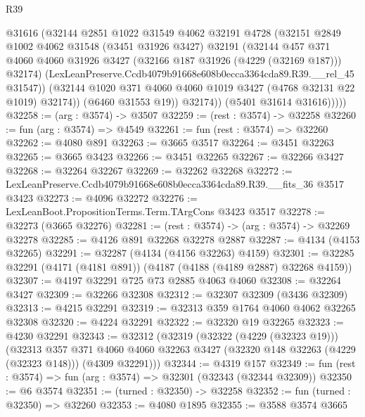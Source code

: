\begin{lexlean}{R39}
\begin{coremodule}
                  @31616
                  (@32144
                    @2851
                    @1022
                    @31549
                    @4062
                    @32191
                    @4728
                    (@32151
                      @2849
                      @1002
                      @4062
                      @31548
                      (@3451 @31926 @3427)
                      @32191
                      (@32144
                        @457
                        @371
                        @4060
                        @4060
                        @31926
                        @3427
                        (@32166 @187 @31926 (@4229 (@32169 @187)))
                        @32174)
                      (LexLeanPreserve.Ccdb4079b91668e608b0ecca3364cda89.R39.__rel_45 @31547))
                    (@32144 @1020 @371 @4060 @4060 @1019 @3427 (@4768 @32131 @22 @1019) @32174))
                  (@6460 @31553 @19))
                @32174))
            (@5401 @31614 @31616)))))
@32258 := (arg : @3574) -> @3507
@32259 := (rest : @3574) -> @32258
@32260 := fun (arg : @3574) => @4549
@32261 := fun (rest : @3574) => @32260
@32262 := @4080 @891
@32263 := @3665 @3517
@32264 := @3451 @32263
@32265 := @3665 @3423
@32266 := @3451 @32265
@32267 := @32266 @3427
@32268 := @32264 @32267
@32269 := @32262 @32268
@32272 := LexLeanPreserve.Ccdb4079b91668e608b0ecca3364cda89.R39.__fits_36 @3517 @3423
@32273 := @4096 @32272
@32276 := LexLeanBoot.PropositionTerms.Term.TArgCons @3423 @3517
@32278 := @32273 (@3665 @32276)
@32281 := (rest : @3574) -> (arg : @3574) -> @32269 @32278
@32285 := @4126 @891 @32268 @32278 @2887
@32287 := @4134 (@4153 @32265)
@32291 := @32287 (@4134 (@4156 @32263) @4159)
@32301 := @32285 @32291 (@4171 (@4181 @891)) (@4187 (@4188 (@4189 @2887) @32268 @4159))
@32307 := @4197 @32291 @725 @73 @2885 @4063 @4060
@32308 := @32264 @3427
@32309 := @32266 @32308
@32312 := @32307 @32309 (@3436 @32309)
@32313 := @4215 @32291
@32319 := @32313 @359 @1764 @4060 @4062 @32265 @32308
@32320 := @4224 @32291
@32322 := @32320 @19 @32265
@32323 := @4230 @32291
@32343 := @32312
    (@32319
      (@32322 (@4229 (@32323 @19)))
      (@32313
        @357
        @371
        @4060
        @4060
        @32263
        @3427
        (@32320 @148 @32263 (@4229 (@32323 @148)))
        (@4309 @32291)))
@32344 := @4319 @157
@32349 := fun (rest : @3574) => fun (arg : @3574) => @32301 (@32343 (@32344 @32309))
@32350 := @6 @3574
@32351 := (turned : @32350) -> @32258
@32352 := fun (turned : @32350) => @32260
@32353 := @4080 @1895
@32355 := @3588 @3574 @3665

\end{coremodule}
\end{lexlean}
